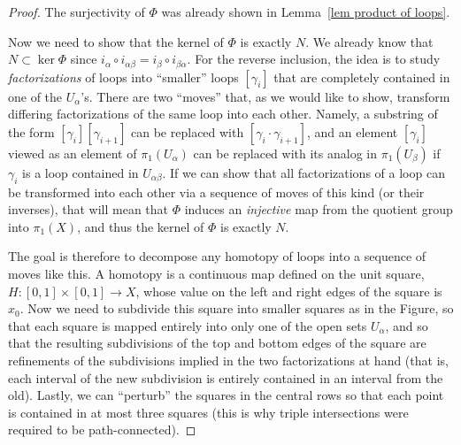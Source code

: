 \begin{proof}
    The surjectivity of $\Phi$ was already shown in Lemma~\ref{lem product of loops}. 
    
    Now we need to show that the kernel of $\Phi$ is exactly $N$. We already know that $N\subset \ker \Phi$ since $i_\alpha\circ i_{\alpha\beta}=i_\beta\circ i_{\beta\alpha}$. For the reverse inclusion, the idea is to study \emph{factorizations} of loops into ``smaller'' loops $[\gamma_i]$ that are completely contained in one of the $U_\alpha$'s. There are two ``moves'' that, as we would like to show, transform differing factorizations of the same loop into each other. Namely, a substring of the form $[\gamma_i][\gamma_{i+1}]$ can be replaced with $[\gamma_i\cdot \gamma_{i+1}]$, and an element $[\gamma_i]$ viewed as an element of $\pi_1(U_\alpha)$ can be replaced with its analog in $\pi_1(U_\beta)$ if $\gamma_i$ is a loop contained in $U_{\alpha\beta}$. If we can show that all factorizations of a loop can be transformed into each other via a sequence of moves of this kind (or their inverses), that will mean that $\Phi$ induces an \emph{injective} map from the quotient group into $\pi_1(X)$, and thus the kernel of $\Phi$ is exactly $N$.

    The goal is therefore to decompose any homotopy of loops into a sequence of moves like this. A homotopy is a continuous map defined on the unit square, $H:[0,1]\times[0,1]\to X$, whose value on the left and right edges of the square is $x_0$. Now we need to subdivide this square into smaller squares as in the Figure, so that each square is mapped entirely into only one of the open sets $U_\alpha$, and so that the resulting subdivisions of the top and bottom edges of the square are refinements of the subdivisions implied in the two factorizations at hand (that is, each interval of the new subdivision is entirely contained in an interval from the old). Lastly, we can ``perturb'' the squares in the central rows so that each point is contained in at most three squares (this is why triple intersections were required to be path-connected).


\end{proof}
